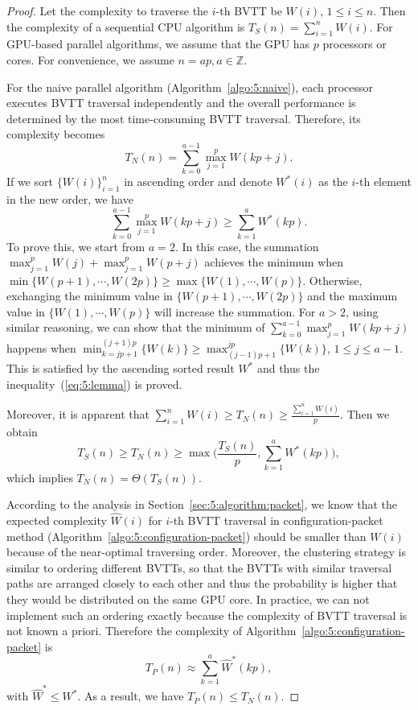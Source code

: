 \begin{proof}
Let the complexity to traverse the $i$-th BVTT be $W(i)$, $1\leq i\leq n$. Then the complexity of a
sequential CPU algorithm is $T_S(n) = \sum_{i=1}^n W(i)$. For GPU-based parallel algorithms, we assume that the
GPU has $p$ processors or cores. For convenience, we assume $n = ap, a \in \mathbb{Z}$.

For the naive parallel algorithm (Algorithm~\ref{algo:5:naive}), each processor executes BVTT traversal independently and the overall performance is determined by the most time-consuming BVTT traversal. Therefore, its complexity becomes
$$T_N(n) = \sum_{k=0}^{a-1} \max_{j=1}^p W(kp + j).$$
If we sort $\{W(i)\}_{i=1}^n$ in ascending order and denote $W^*(i)$ as the $i$-th element in the new order, we have
\begin{equation}
\label{eq:5:lemma}
\sum_{k=0}^{a-1} \max_{j=1}^p W(kp + j) \geq \sum_{k=1}^{a}W^*(kp).
\end{equation}
To prove this, we start from $a=2$. In this case, the summation $\max_{j=1}^p W(j) + \max_{j=1}^p W(p + j)$ achieves the minimum when $\min{\{W(p+1), \cdots, W(2p)\}} \geq \max{\{W(1), \cdots, W(p)\}}$. Otherwise, exchanging the minimum value in $\{W(p+1), \cdots, W(2p)\}$ and the maximum value in $\{W(1), \cdots, W(p)\}$ will increase the summation. For $a>2$, using similar reasoning, we can show that the minimum of $\sum_{k=0}^{a-1} \max_{j=1}^p W(kp + j)$ happens when $\min_{k=jp+1}^{(j+1)p}{\{W(k)\}} \geq \max_{(j-1)p+1}^{jp}{\{W(k)\}}$, $1 \leq j \leq a - 1$. This is satisfied by the ascending sorted result $W^*$ and thus the inequality~(\ref{eq:5:lemma}) is proved.

Moreover, it is apparent that $\sum_{i=1}^n W(i) \geq T_N(n) \geq \frac{\sum_{i=1}^n W(i)}{p}$. Then we obtain
$$T_S(n) \geq T_N(n) \geq \max\big(\frac{T_S(n)}{p}, \sum_{k=1}^{a}W^*(kp)\big),$$
which implies $T_N(n) = \Theta(T_S(n))$.

According to the analysis in Section~\ref{sec:5:algorithm:packet}, we know that the expected complexity $\hat{W}(i)$ for $i$-th BVTT traversal in configuration-packet method (Algorithm~\ref{algo:5:configuration-packet}) should be smaller than $W(i)$ because of the near-optimal traversing order. Moreover, the clustering strategy is similar to ordering different BVTTs, so that the BVTTs with similar traversal paths are arranged closely to each other and thus the probability is higher that they would be distributed on the same GPU core. In practice, we can not implement such an ordering exactly
because the complexity of BVTT traversal is not known a priori. Therefore the complexity of Algorithm~\ref{algo:5:configuration-packet} is $$T_P(n) \approx \sum_{k=1}^a \hat{W}^*(kp),$$ with $\hat{W}^* \leq W^*$. As a result, we have $T_P(n) \leq T_N(n)$.


\end{proof}
